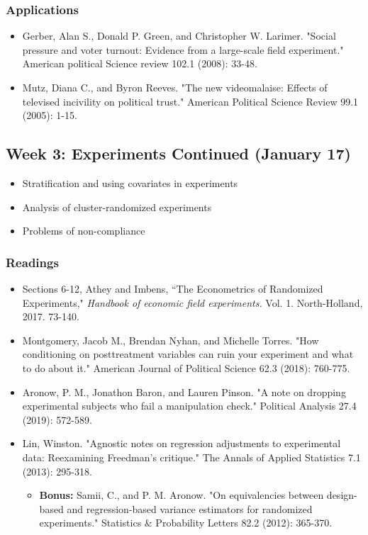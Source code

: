 \documentclass[11pt, article, oneside]{memoir}
\theoremstyle{Assumption}
\begin{document}
\subsubsection*{Applications}

\begin{itemize}
\item Gerber, Alan S., Donald P. Green, and Christopher W. Larimer. "Social pressure and voter turnout: Evidence from a large-scale field experiment." American political Science review 102.1 (2008): 33-48.
\item Mutz, Diana C., and Byron Reeves. "The new videomalaise: Effects of televised incivility on political trust." American Political Science Review 99.1 (2005): 1-15.
\end{itemize}

\subsection{Week 3: Experiments Continued (January 17)}

\begin{itemize}
\item Stratification and using covariates in experiments
\item Analysis of cluster-randomized experiments
\item Problems of non-compliance
\end{itemize}

\subsubsection*{Readings}

\begin{itemize}
\item Sections 6-12, Athey and Imbens, ``The Econometrics of Randomized Experiments,"  \textit{Handbook of economic field experiments.} Vol. 1. North-Holland, 2017. 73-140. 
\item Montgomery, Jacob M., Brendan Nyhan, and Michelle Torres. "How conditioning on posttreatment variables can ruin your experiment and what to do about it." American Journal of Political Science 62.3 (2018): 760-775.
\item Aronow, P. M., Jonathon Baron, and Lauren Pinson. "A note on dropping experimental subjects who fail a manipulation check." Political Analysis 27.4 (2019): 572-589.
\item Lin, Winston. "Agnostic notes on regression adjustments to experimental data: Reexamining Freedman’s critique." The Annals of Applied Statistics 7.1 (2013): 295-318.
\begin{itemize}
\item \textbf{Bonus:} Samii, C., and P. M. Aronow. "On equivalencies between design-based and regression-based variance estimators for randomized experiments." Statistics \& Probability Letters 82.2 (2012): 365-370.
\end{itemize}

\end{itemize}
\end{document}
